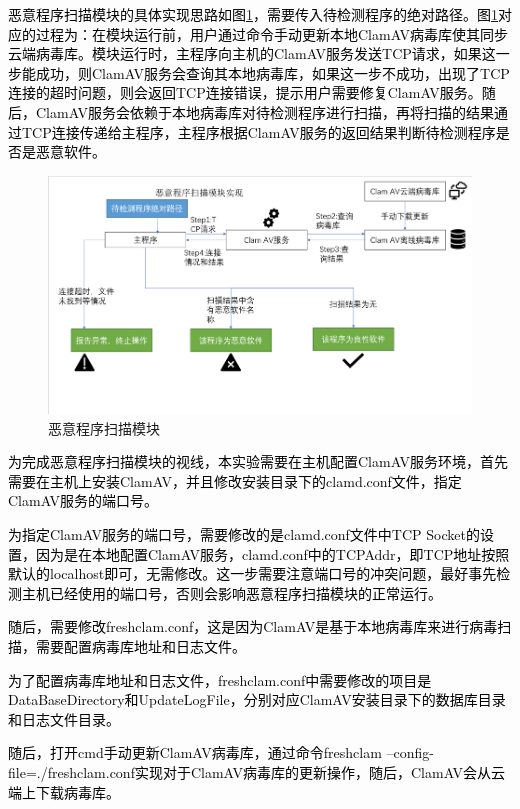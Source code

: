 \textcolor{black}{恶意程序扫描模块的具体实现思路如图\ref{fig:malware_scan_module}，需要传入待检测程序的绝对路径。图\ref{fig:malware_scan_module}对应的过程为：在模块运行前，用户通过命令手动更新本地ClamAV病毒库使其同步云端病毒库。模块运行时，主程序向主机的ClamAV服务发送TCP请求，如果这一步能成功，则ClamAV服务会查询其本地病毒库，如果这一步不成功，出现了TCP连接的超时问题，则会返回TCP连接错误，提示用户需要修复ClamAV服务。随后，ClamAV服务会依赖于本地病毒库对待检测程序进行扫描，再将扫描的结果通过TCP连接传递给主程序，主程序根据ClamAV服务的返回结果判断待检测程序是否是恶意软件。}

\begin{figure}[htbp]
  \centering
  \includegraphics[]{images/malware_scan_module.png}
  \caption{恶意程序扫描模块}\label{fig:malware_scan_module}
\end{figure}

\textcolor{black}{为完成恶意程序扫描模块的视线，本实验需要在主机配置ClamAV服务环境，首先需要在主机上安装ClamAV，并且修改安装目录下的clamd.conf文件，指定ClamAV服务的端口号。}

\textcolor{black}{为指定ClamAV服务的端口号，需要修改的是clamd.conf文件中TCP Socket的设置，因为是在本地配置ClamAV服务，clamd.conf中的TCPAddr，即TCP地址按照默认的localhost即可，无需修改。这一步需要注意端口号的冲突问题，最好事先检测主机已经使用的端口号，否则会影响恶意程序扫描模块的正常运行。}

\textcolor{black}{随后，需要修改freshclam.conf，这是因为ClamAV是基于本地病毒库来进行病毒扫描，需要配置病毒库地址和日志文件。}

\textcolor{black}{为了配置病毒库地址和日志文件，freshclam.conf中需要修改的项目是DataBaseDirectory和UpdateLogFile，分别对应ClamAV安装目录下的数据库目录和日志文件目录。}

\textcolor{black}{随后，打开cmd手动更新ClamAV病毒库，通过命令freshclam –config-file=./freshclam.conf实现对于ClamAV病毒库的更新操作，随后，ClamAV会从云端上下载病毒库。}

